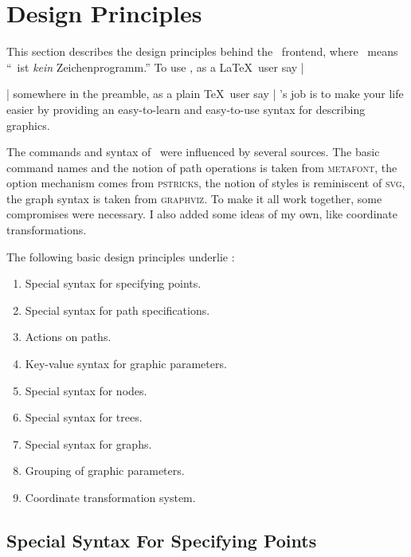 %
%
%

\section{Design Principles}

This section describes the design principles behind the \tikzname\ frontend,
where \tikzname\ means ``\tikzname\ ist \emph{kein} Zeichenprogramm.'' To use
\tikzname, as a \LaTeX\ user say |\usepackage{tikz}| somewhere in the preamble,
as a plain \TeX\ user say | \tikzname's job is to make your
life easier by providing an easy-to-learn and easy-to-use syntax for describing
graphics.

The commands and syntax of \tikzname\ were influenced by several sources. The
basic command names and the notion of path operations is taken from
\textsc{metafont}, the option mechanism comes from \textsc{pstricks}, the
notion of styles is reminiscent of \textsc{svg}, the graph syntax is taken from
\textsc{graphviz}. To make it all work together, some compromises were
necessary. I also added some ideas of my own, like coordinate transformations.

The following basic design principles underlie \tikzname:
%
\begin{enumerate}
    \item Special syntax for specifying points.
    \item Special syntax for path specifications.
    \item Actions on paths.
    \item Key-value syntax for graphic parameters.
    \item Special syntax for nodes.
    \item Special syntax for trees.
    \item Special syntax for graphs.
    \item Grouping of graphic parameters.
    \item Coordinate transformation system.
\end{enumerate}


\subsection{Special Syntax For Specifying Points}

